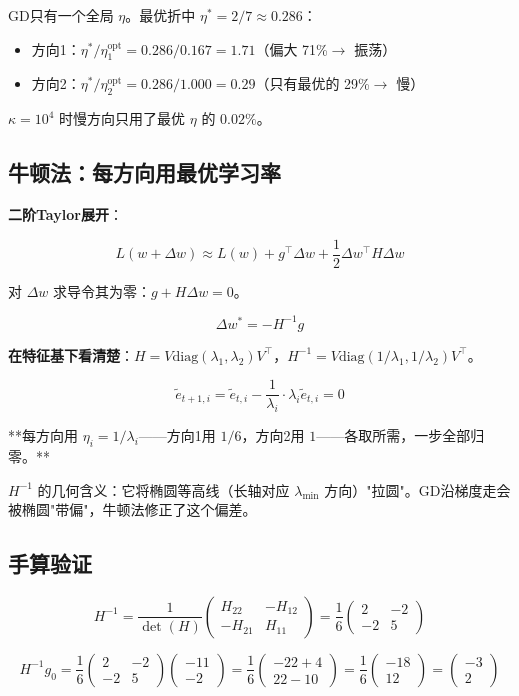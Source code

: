 \documentclass[12pt,a4paper]{article}
\begin{document}
GD只有一个全局 $\eta$。最优折中 $\eta^* = 2/7 \approx 0.286$：

\begin{itemize}[leftmargin=*,nosep]
\item 方向1：$\eta^*/\eta_1^{\text{opt}} = 0.286/0.167 = 1.71$（偏大 71\%$\to$ 振荡）
\item 方向2：$\eta^*/\eta_2^{\text{opt}} = 0.286/1.000 = 0.29$（只有最优的 29\%$\to$ 慢）
\end{itemize}


$\kappa = 10^4$ 时慢方向只用了最优 $\eta$ 的 $0.02\%$。


\subsection{牛顿法：每方向用最优学习率}

\textbf{二阶Taylor展开}：


\[L(w + \Delta w) \approx L(w) + g^\top \Delta w + \frac{1}{2}\Delta w^\top H \Delta w\]

对 $\Delta w$ 求导令其为零：$g + H\Delta w = 0$。


\[\Delta w^* = -H^{-1}g\]

\textbf{在特征基下看清楚}：$H = V\text{diag}(\lambda_1,\lambda_2)V^\top$，$H^{-1} = V\text{diag}(1/\lambda_1, 1/\lambda_2)V^\top$。


\[\tilde{e}_{t+1,i} = \tilde{e}_{t,i} - \frac{1}{\lambda_i} \cdot \lambda_i \tilde{e}_{t,i} = 0\]

**每方向用 $\eta_i = 1/\lambda_i$——方向1用 $1/6$，方向2用 $1$——各取所需，一步全部归零。**

$H^{-1}$ 的几何含义：它将椭圆等高线（长轴对应 $\lambda_{\min}$ 方向）"拉圆"。GD沿梯度走会被椭圆"带偏"，牛顿法修正了这个偏差。


\subsection{手算验证}


\[H^{-1} = \frac{1}{\det(H)}\begin{pmatrix}H_{22}&-H_{12}\\-H_{21}&H_{11}\end{pmatrix} = \frac{1}{6}\begin{pmatrix}2&-2\\-2&5\end{pmatrix}\]


\[H^{-1}g_0 = \frac{1}{6}\begin{pmatrix}2&-2\\-2&5\end{pmatrix}\begin{pmatrix}-11\\-2\end{pmatrix} = \frac{1}{6}\begin{pmatrix}-22+4\\22-10\end{pmatrix} = \frac{1}{6}\begin{pmatrix}-18\\12\end{pmatrix} = \begin{pmatrix}-3\\2\end{pmatrix}\]
\end{document}
